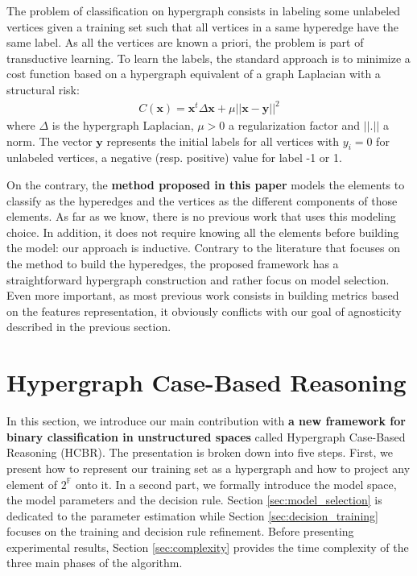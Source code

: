 \documentclass[preprint,12pt]{elsarticle}
\def\HCBR{{\sc HCBR}}
\theoremstyle{definition}
\begin{document}
The problem of classification on hypergraph consists in labeling some unlabeled vertices given a training set such that all vertices in a same hyperedge have the same label. As all the vertices are known a priori, the problem is part of transductive learning. To learn the labels, the standard approach is to minimize a cost function based on a hypergraph equivalent of a graph Laplacian \cite{ijcai2017-387,NIPS2006_3128} with a structural risk:
\begin{align}
C(\mathbf{x}) = \mathbf{x}^t \Delta \mathbf{x} + \mu ||\mathbf{x} - \mathbf{y}||^2
\end{align} where $\Delta$ is the hypergraph Laplacian, $\mu >0$ a regularization factor and $||.||$ a norm. The vector $\mathbf{y}$ represents the initial labels for all vertices with $y_i = 0$ for unlabeled vertices, a negative (resp. positive) value for label -1 or 1.

On the contrary, the {\bf method proposed in this paper} models the elements to classify as the hyperedges and the vertices as the different components of those elements. As far as we know, there is no previous work that uses this modeling choice. In addition, it does not require knowing all the elements before building the model: our approach is inductive. Contrary to the literature that focuses on the method to build the hyperedges, the proposed framework has a straightforward hypergraph construction and rather focus on model selection. Even more important, as most previous work consists in building metrics based on the features representation, it obviously conflicts with our goal of agnosticity described in the previous section.



\section{Hypergraph Case-Based Reasoning} 
\label{sec:hcbr}

In this section, we introduce our main contribution with {\bf a new framework for binary classification in unstructured spaces} called Hypergraph Case-Based Reasoning (\HCBR). The presentation is broken down into five steps. First, we present how to represent our training set as a hypergraph and how to project any element of $2^{\mathbb F}$ onto it. In a second part, we formally introduce the model space, the model parameters and the decision rule. Section \ref{sec:model_selection} is dedicated to the parameter estimation while Section \ref{sec:decision_training} focuses on the training and decision rule refinement. Before presenting experimental results, Section \ref{sec:complexity} provides the time complexity of the three main phases of the algorithm. 
\end{document}
